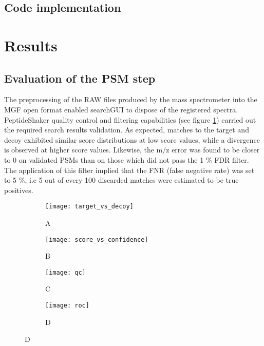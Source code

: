\subsection{Code implementation}

\section{Results}

\subsection{Evaluation of the PSM step}

The preprocessing of the RAW files produced by the mass spectrometer into the MGF open format enabled searchGUI to dispose of the registered spectra. PeptideShaker quality control and filtering capabilities (see figure \ref{figure:qc_validation}) carried out the required search results validation. As expected, matches to the target and decoy exhibited similar score distributions at low score values, while a divergence is observed at higher score values. Likewise, the m/z error was found to be closer to 0 on validated PSMs than on those which did not pass the 1 \% FDR filter. The application of this filter implied that the FNR (false negative rate) was set to 5 \%, i.e 5 out of every 100 discarded matches were estimated to be true positives.



\begin{figure}[!h]
\centering
\begin{subfigure}{.45\textwidth}
  \centering
  \caption*{A}
  \texttt{[image: target\_vs\_decoy]}
\end{subfigure}
\begin{subfigure}{.45\textwidth}
  \centering
    \caption*{B}
  \texttt{[image: score\_vs\_confidence]}
\end{subfigure}
\bigskip

\begin{subfigure}{.45\textwidth}
  \centering
    \caption*{C}
  \texttt{[image: qc]}
\end{subfigure}
\begin{subfigure}{.45\textwidth}
  \centering
    \caption*{D}
  \texttt{[image: roc]}
\end{subfigure}
\label{figure:qc_validation}
\end{figure}


